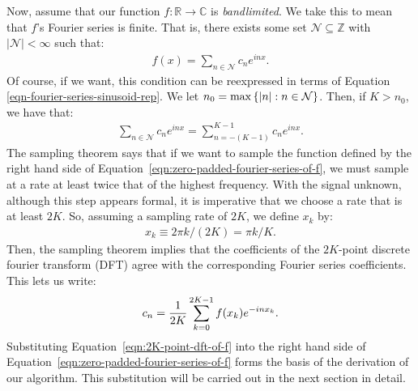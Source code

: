 Now, assume that our function $f : \mathbb{R} \to \mathbb{C}$
is \emph{bandlimited}. We take this to mean that $f$'s
Fourier series is finite. That is, there exists some set
$\mathcal{N} \subseteq \mathbb{Z}$
with $|\mathcal{N}| < \infty$ such that:
\begin{align*}
  f(x) = \sum_{n \in \mathcal{N}} c_n e^{inx}.
\end{align*}
Of course, if we want, this condition can be reexpressed in terms of
Equation \ref{eqn-fourier-series-sinusoid-rep}.  We let
$n_0 = \max \left\{\left|n\right| : n \in \mathcal{N}\right\}$. Then, if $K > n_0$, we
have that:
\begin{align} \label{eqn:zero-padded-fourier-series-of-f}
  \sum_{n \in \mathcal{N}} c_n e^{inx} = \sum_{n=-(K-1)}^{K-1} c_ne^{inx}.
\end{align}
The sampling theorem says that if we want to sample the function
defined by the right hand side of
Equation~\ref{eqn:zero-padded-fourier-series-of-f}, we must sample at
a rate at least twice that of the highest frequency. With the signal
unknown, although this step appears formal, it is imperative that we
choose a rate that is at least $2K$. So, assuming a sampling rate of
$2K$, we define $x_k$ by:
\begin{align*}
  x_k \equiv 2\pi k /(2K) = \pi k / K.
\end{align*}
Then, the sampling theorem implies that the coefficients of the
$2K$-point discrete fourier transform (DFT) agree with the
corresponding Fourier series coefficients. This lets us write:
\begin{align} \label{eqn:2K-point-dft-of-f}
  c_n = {1 \over 2K} \sum_{k=0}^{2K-1} f(x_k) e^{-inx_k}.
\end{align}
Substituting Equation~\ref{eqn:2K-point-dft-of-f} into the right hand
side of Equation~\ref{eqn:zero-padded-fourier-series-of-f} forms the
basis of the derivation of our algorithm. This substitution will be
carried out in the next section in detail.

